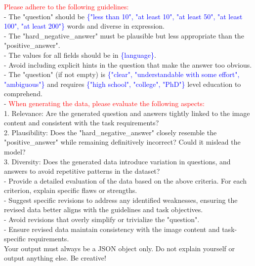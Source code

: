\begin{figure*}[t]
\begin{prompt}[title={Prompt: Synthesizing VQA Data}, label=prompt:vqa]
\textcolor{red}{Please adhere to the following guidelines:}\\
- The "question" should be \textcolor{blue}{\{"less than 10", "at least 10", "at least 50", "at least 100", "at least 200"\}} words and diverse in expression.\\
- The "hard\_negative\_answer" must be plausible but less appropriate than the "positive\_answer".\\
- The values for all fields should be in \textcolor{blue}{\{language\}}.\\
- Avoid including explicit hints in the question that make the answer too obvious.\\
- The "question" (if not empty) is \textcolor{blue}{\{"clear", "understandable with some effort", "ambiguous"\}} and requires \textcolor{blue}{\{"high school", "college", "PhD"\}} level education to comprehend.\\
- \textcolor{red}{When generating the data, please evaluate the following aspects:}\\
  1. Relevance: Are the generated question and answers tightly linked to the image content and consistent with the task requirements?\\
  2. Plausibility: Does the "hard\_negative\_answer" closely resemble the "positive\_answer" while remaining definitively incorrect? Could it mislead the model?\\
  3. Diversity: Does the generated data introduce variation in questions, and answers to avoid repetitive patterns in the dataset?\\
- Provide a detailed evaluation of the data based on the above criteria. For each criterion, explain specific flaws or strengths.\\
- Suggest specific revisions to address any identified weaknesses, ensuring the revised data better aligns with the guidelines and task objectives.\\
- Avoid revisions that overly simplify or trivialize the "question".\\
- Ensure revised data maintain consistency with the image content and task-specific requirements.\\

Your output must always be a JSON object only. Do not explain yourself or output anything else. Be creative!
    
\end{prompt}
\end{figure*}


